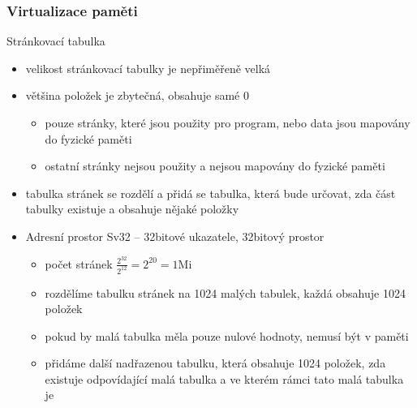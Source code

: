 \documentclass{beamer}
\begin{document}
\begin{frame}
\frametitle{Virtualizace paměti}

Stránkovací tabulka
\begin{itemize}
\item velikost stránkovací tabulky je nepřiměřeně velká
\item většina položek je zbytečná, obsahuje samé 0
\begin{itemize}
\item pouze stránky, které jsou použity pro program, nebo data jsou mapovány do fyzické paměti
\item ostatní stránky nejsou použity a nejsou mapovány do fyzické paměti
\end{itemize}
\item tabulka stránek se rozdělí a přidá se tabulka, která bude určovat, zda část tabulky existuje a obsahuje nějaké položky
\item Adresní prostor Sv32 -- 32bitové ukazatele, 32bitový prostor
\begin{itemize}
\item počet stránek $\frac{2^{32}}{2^{12}} = 2^{20} = 1\text{Mi}$
\item rozdělíme tabulku stránek na 1024 malých tabulek, každá obsahuje 1024 položek
\item pokud by malá tabulka měla pouze nulové hodnoty, nemusí být v paměti
\item přidáme další nadřazenou tabulku, která obsahuje 1024 položek, zda existuje odpovídající malá tabulka a ve kterém rámci tato malá tabulka je
\end{itemize}
\end{itemize}
\end{frame}
\end{document}
